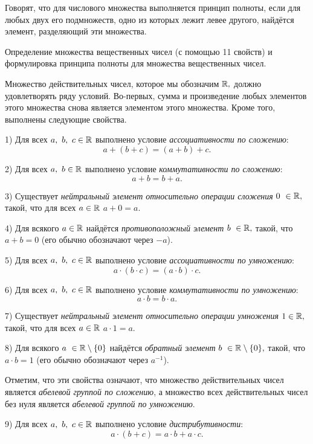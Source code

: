 \begin{definition}
	Говорят,
	что для числового множества
	выполняется принцип полноты, если
	для любых двух его подмножеств,
	одно из которых лежит левее
	другого, найдётся элемент,
	разделяющий эти множества.
\end{definition}

\newpage
\begin{problem}
Определение множества вещественных чисел (с помощью 11 свойств) и формулировка
принципа полноты для множества вещественных чисел.
\end{problem}

Множество действительных чисел,
которое мы обозначим $\mathbb{R},$
должно удовлетворять ряду условий.
Во-первых, сумма и произведение любых элементов
этого множества снова является элементом
этого множества.
Кроме того, выполнены следующие свойства.

1) Для всех $a, \ b, \ c \in\mathbb{R}$
выполнено условие \emph{ассоциативности по сложению}:
$$
	a+(b+c)=(a+b)+c.
$$

2) Для всех $a, \ b \in\mathbb{R}$
выполнено условие \emph{коммутативности по сложению}:
$$
	a+b=b+a.
$$

3) Существует \emph{нейтральный элемент относительно
	операции сложения}
$0 \ \in\mathbb{R},$ такой, что для всех $a \in\mathbb{R}$
$a+0=a$.

4) Для всякого $a \in\mathbb{R}$ найдётся
\emph{противоположный элемент} $b \ \in\R,$
такой, что $a+b=0$ (его обычно обозначают через
$-a$).

5) Для всех $a, \ b, \ c \in\mathbb{R}$
выполнено условие \emph{ассоциативности по умножению}:
$$
	a\cdot(b\cdot c)=(a\cdot b)\cdot c.
$$

6) Для всех $a, \ b, \ c \in\mathbb{R}$
выполнено условие \emph{коммутативности по умножению}:
$$
	a\cdot b=b\cdot a.
$$

7) Существует \emph{нейтральный элемент относительно
	операции умножения}
$1\in\mathbb{R},$ такой, что для всех $a\in\mathbb{R}$
$a\cdot1=a$.

8) Для всякого $a \ \in\R\setminus\{0\}$ найдётся
\emph{обратный элемент} $b \ \in\mathbb{R}\setminus\{0\},$
такой, что $a\cdot b=1$ (его обычно обозначают через
$a^{-1}$).

Отметим, что эти свойства означают, что
множество действительных чисел
является \emph{абелевой группой по сложению},
а множество всех действительных чисел
без нуля является \emph{абелевой группой по умножению}.

9) Для всех $a, \ b, \ c \in\mathbb{R}$
выполнено условие \emph{дистрибутивности}:
$$
	a\cdot(b+c)=a\cdot b+a\cdot c.
$$

